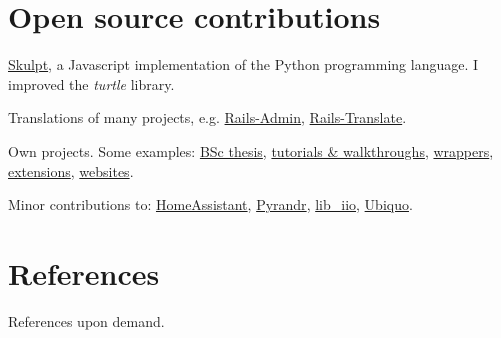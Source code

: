 \documentclass[a4paper]{report}
\newcommand{\listitemspace}{0.25em}
\renewenvironment{itemize}
{\begin{list}{}{\setlength{\leftmargin}{0em}
                \setlength{\parskip}{0em}
                \setlength{\itemsep}{\listitemspace}
                \setlength{\parsep}{\listitemspace}}}
{\end{list}}
\begin{document}
\vspace{-1em}
\section*{Open source contributions}
\begin{itemize}
    \item \href{https://github.com/royalmo/skulpt}{Skulpt}, a Javascript implementation of the Python programming language. I improved the \textit{turtle} library.
    \item Translations of many projects, e.g. \href{https://github.com/starchow/rails_admin-i18n}{Rails-Admin}, \href{https://github.com/bfcapell/translate}{Rails-Translate}.
    \item Own projects. Some examples: \href{https://gyroscreen.ericroy.net/}{BSc thesis}, \href{https://github.com/royalmo/docker-networks}{tutorials \& walkthroughs}, \href{https://github.com/royalmo/openvpn-manager}{wrappers}, \href{https://github.com/royalmo/itic-copilot}{extensions}, \href{https://umbages.cat}{websites}.
    \item Minor contributions to: \href{https://github.com/home-assistant/developers.home-assistant}{HomeAssistant}, \href{https://github.com/royalmo/pyrandr}{Pyrandr}, \href{https://github.com/analogdevicesinc/libiio/pull/1159}{lib\_iio}, \href{https://github.com/bfcapell/ubiquo/compare/master...royalmo:ubiquo:add_dynamically_ubiquo_assets_2024_11_28}{Ubiquo}.
\end{itemize}


\vspace{-1em}
\section*{References}

References upon demand.

\end{document}
